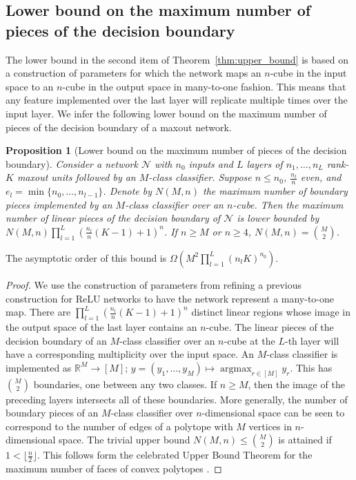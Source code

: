 \documentclass{article}
\newtheorem{proposition}[theorem]{Proposition}
\theoremstyle{definition}
\begin{document}
\subsection{Lower bound on the maximum number of pieces of the decision boundary}
The lower bound in the second item of Theorem~\ref{thm:upper_bound} is based on a construction of parameters for which the network maps an $n$-cube in the input space to an $n$-cube in the output space in many-to-one fashion. 
This means that any feature implemented over the last layer will replicate multiple times over the input layer.
We infer the following lower bound on the maximum number of pieces of the decision boundary of a maxout network. 

\begin{proposition}[Lower bound on the maximum number of pieces of the decision boundary]
\label{cor:max-decision}
Consider a network $\mathcal{N}$ with $n_0$ inputs and $L$ layers of $n_1,\ldots, n_L$ rank-$K$ maxout units followed by an $M$-class classifier.
Suppose $n\leq n_0$, $\frac{n_l}{n}$ even, and $e_l = \min\{n_0,\ldots, n_{l-1}\}$. 
Denote by $N(M,n)$ the maximum number of boundary pieces implemented by an $M$-class classifier over an $n$-cube. 
Then the maximum number of linear pieces of the decision boundary of $\mathcal{N}$ is lower bounded by $N(M,n) \prod_{l=1}^{L} (\frac{n_l}{n} (K-1)+1)^n$.
If $n\geq M$ or $n\geq 4$, $N(M,n)=\binom{M}{2}$. 
\end{proposition}

The asymptotic order of this bound is $\Omega(M^2\prod_{l=1}^L(n_lK)^{n_0})$.  
\begin{proof}
We use the construction of parameters from \citet[Proposition 3.11]{sharp2021} refining a previous construction for ReLU networks \citep{NIPS2014_5422} to have the network represent a many-to-one map. 
There are $\prod_{l=1}^{L} (\frac{n_l}{n} (K-1)+1)^n$ distinct linear regions whose image in the output space of the last layer contains an $n$-cube. 
The linear pieces of the decision boundary of an $M$-class classifier over an $n$-cube at the $L$-th layer will have a corresponding multiplicity over the input space.
An $M$-class classifier is implemented as $\mathbb{R}^M\to[M]$; $y=(y_1,\ldots, y_M) \mapsto \operatorname{argmax}_{r\in [M]}y_r$. 
This has $\binom{M}{2}$ boundaries, one between any two classes. 
If $n\geq M$, then the image of the preceding layers intersects all of these boundaries.
More generally, the number of boundary pieces of an $M$-class classifier over $n$-dimensional space can be seen to correspond to the number of edges of a polytope with $M$ vertices in $n$-dimensional space. 
The trivial upper bound $N(M,n) \leq \binom{M}{2}$ is attained if $1<\lfloor \frac{n}{2} \rfloor$. This follows form the celebrated Upper Bound Theorem for the maximum number of faces of convex polytopes \citep{mcmullen_1970}. 
\end{proof}
\end{document}
